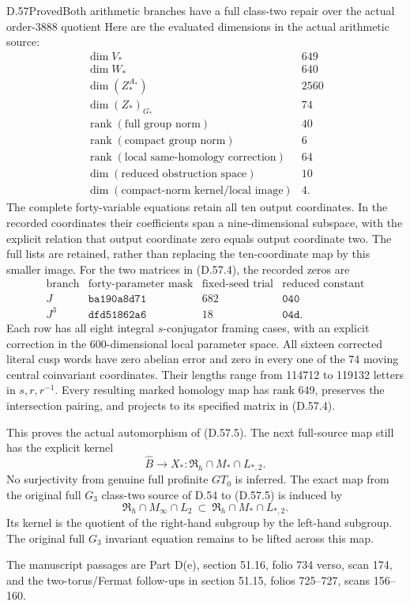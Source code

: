\begin{statement}{D.57}{Proved}{Both arithmetic branches have a full class-two repair over the actual order-3888 quotient}
Here are the evaluated dimensions in the actual arithmetic
source:
\[
\begin{array}{c|r}
 \dim V_*&649\\
 \dim W_*&640\\
 \dim(Z_*^{A_*})&2560\\
 \dim(Z_*)_{G_*}&74\\
 \operatorname{rank}(\text{full group norm})&40\\
 \operatorname{rank}(\text{compact group norm})&6\\
 \operatorname{rank}(\text{local same-homology correction})&64\\
 \dim(\text{reduced obstruction space})&10\\
 \dim(\text{compact-norm kernel/local image})&4 .
\end{array}
 \tag{D.57.6}
\]
The complete forty-variable equations retain all ten output
coordinates. In the recorded coordinates their coefficients
span a nine-dimensional subspace, with the explicit relation
that output coordinate zero equals output coordinate two.
The full lists are retained, rather than replacing the
ten-coordinate map by this smaller image.
For the two matrices in (D.57.4), the recorded zeros are
\[
\begin{array}{c|c|r|c}
 \text{branch}&\text{forty-parameter mask}&
       \text{fixed-seed trial}&\text{reduced constant}\\
 J&\mathtt{ba190a8d71}&682&\mathtt{040}\\
 J^3&\mathtt{dfd51862a6}&18&\mathtt{04d}.
\end{array}
 \tag{D.57.7}
\]
Each row has all eight integral \(s\)-conjugator framing cases,
with an explicit correction in the 600-dimensional local
parameter space. All sixteen corrected literal cusp words
have zero abelian error and zero in every one of the 74 moving
central coinvariant coordinates. Their lengths range from
114712 to 119132 letters in \(s,r,r^{-1}\). Every resulting
marked homology map has rank 649, preserves the intersection
pairing, and projects to its specified matrix in (D.57.4).

This proves the actual automorphism of (D.57.5). The next
full-source map still has the explicit kernel
\[
 \widehat B\longrightarrow X_*:
       \mathfrak R_h\cap M_*\cap L_{*,2}.
 \tag{D.57.8}
\]
No surjectivity from genuine full profinite \(GT_0\) is inferred.
The exact map from the original full \(G_3\) class-two source
of D.54 to (D.57.5) is induced by
\[
 \mathfrak R_h\cap M_\infty\cap L_2
 \ \subset\
 \mathfrak R_h\cap M_*\cap L_{*,2}.
 \tag{D.57.9}
\]
Its kernel is the quotient of the right-hand subgroup by
the left-hand subgroup. The original full \(G_3\) invariant
equation remains to be lifted across this map.

The manuscript passages are Part D(e), section 51.16,
folio 734 verso, scan 174, and the two-torus/Fermat
follow-ups in section 51.15, folios 725--727, scans 156--160.
\end{statement}
